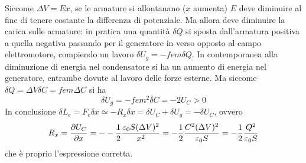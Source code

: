 Siccome $\Delta V=Ex$, se le armature si allontanano ($x$ aumenta) $E$ deve diminuire al fine di tenere costante la
differenza di potenziale. Ma allora deve diminuire la carica sulle armature: in pratica una quantità $\delta Q$
si sposta dall'armatura positiva a quella negativa passando per il generatore in verso opposto al campo elettromotore,
compiendo un lavoro $\delta U_g=-fem \delta Q$. In contemporanea alla diminuzione di energia nel condensatore
si ha un aumento di energia nel generatore, entrambe dovute al lavoro delle forze esterne. Ma siccome
$\delta Q=\Delta V \delta C=fem \Delta C$ si ha
\[
\delta U_g=-fem^2 \delta C=-2 U_C>0
\]
In conclusione $\delta L_e=F_e\delta x \simeq -R_x\delta x= \delta U_C +\delta U_g=-\delta U_C$, ovvero
\[
R_x=\pdv{U_C}{x}=--\frac{1}{2}\frac{\varepsilon_0 S (\Delta V)^2}{x^2}=-\frac{1}{2}\frac{C^2 (\Delta V)^2}{\varepsilon_0 S}=-\frac{1}{2}\frac{Q^2}{\varepsilon_0 S}
\]
che è proprio l'espressione corretta.
